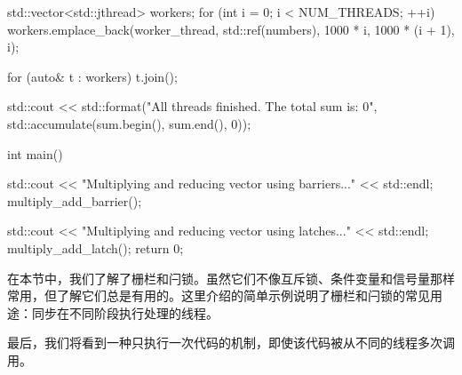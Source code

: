 \begin{cpp}
{    std::vector<std::jthread> workers;
    for (int i = 0; i < NUM_THREADS; ++i) {
        workers.emplace_back(worker_thread, std::ref(numbers), 1000 *
        i, 1000 * (i + 1), i);
    }

    for (auto& t : workers) {
        t.join();
    }

    std::cout << std::format("All threads finished. The total sum is: {0}\n",
    std::accumulate(sum.begin(), sum.end(), 0));
}

int main() {
    std::cout << "Multiplying and reducing vector using barriers..." << std::endl;
    multiply_add_barrier();

    std::cout << "Multiplying and reducing vector using latches..." << std::endl;
    multiply_add_latch();
    return 0;
}
\end{cpp}

在本节中，我们了解了栅栏和闩锁。虽然它们不像互斥锁、条件变量和信号量那样常用，但了解它们总是有用的。这里介绍的简单示例说明了栅栏和闩锁的常见用途：同步在不同阶段执行处理的线程。

最后，我们将看到一种只执行一次代码的机制，即使该代码被从不同的线程多次调用。

























